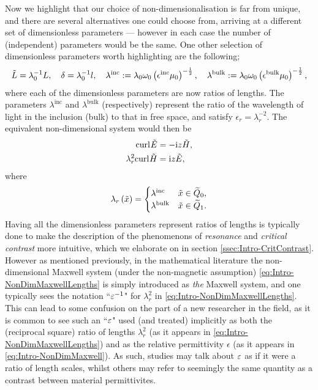 Now we highlight that our choice of non-dimensionalisation is far from unique, and there are several alternatives one could choose from, arriving at a different set of dimensionless parameters --- however in each case the number of (independent) parameters would be the same.
One other selection of dimensionless parameters worth highlighting are the following;
\begin{align} \label{eq:Intro-NonDimLengthScales}
	\tilde{L} = \lambda_0^{-1}L, \quad
	\delta = \lambda_0^{-1}l, \quad
	\lambda^{\mathrm{inc}} := \lambda_0\omega_0\left( \epsilon^{\mathrm{inc}}\mu_0 \right)^{-\frac{1}{2}}, \quad
	\lambda^{\mathrm{bulk}} := \lambda_0\omega_0\left( \epsilon^{\mathrm{bulk}}\mu_0 \right)^{-\frac{1}{2}},
\end{align}
where each of the dimensionless parameters are now ratios of lengths.
The parameters $\lambda^{\mathrm{inc}}$ and $\lambda^{\mathrm{bulk}}$ (respectively) represent the ratio of the wavelength of light in the inclusion (bulk) to that in free space, and satisfy $\epsilon_{r} = \lambda_{r}^{-2}$.
The equivalent non-dimensional system would then be
\begin{subequations} \label{eq:Intro-NonDimMaxwellLengths}
	\begin{align}
		\mathrm{curl}_{}\tilde{E} &= -\mathrm{i} z\tilde{H}, \\
		\lambda_{r}^2\mathrm{curl}_{}\tilde{H} &= \mathrm{i} z\tilde{E},
	\end{align}
\end{subequations}
where
\begin{align*}
	\lambda_r\left( \tilde{x} \right) = 
	\begin{cases} 
		\lambda^{\mathrm{inc}} & \tilde{x}\in\widetilde{Q}_0, \\
		\lambda^{\mathrm{bulk}} & \tilde{x}\in\widetilde{Q}_1.
	\end{cases}
\end{align*}
Having all the dimensionless parameters represent ratios of lengths is typically done to make the description of the phenomenons of \emph{resonance} and \emph{critical contrast} more intuitive, which we elaborate on in section \ref{ssec:Intro-CritContrast}.
However as mentioned previously, in the mathematical literature the non-dimensional Maxwell system (under the non-magnetic assumption) \eqref{eq:Intro-NonDimMaxwellLengths} is simply introduced as \emph{the} Maxwell system, and one typically sees the notation ``$\varepsilon^{-1}$" for $\lambda_r^2$ in \eqref{eq:Intro-NonDimMaxwellLengths}.
This can lead to some confusion on the part of a new researcher in the field, as it is common to see such an ``$\varepsilon$" used (and treated) implicitly as both the (reciprocal square) ratio of lengths $\lambda_r^2$ (as it appears in \eqref{eq:Intro-NonDimMaxwellLengths}) and as the relative permittivity $\epsilon$ (as it appears in \eqref{eq:Intro-NonDimMaxwell}).
As such, studies may talk about $\varepsilon$ as if it were a ratio of length scales, whilst others may refer to seemingly the same quantity as a contrast between material permittivites.


